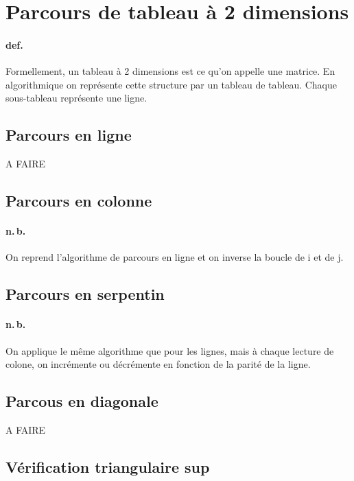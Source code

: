\documentclass{report}
\begin{document}
  \section{Parcours de tableau à 2 dimensions}

    \paragraph{def.} Formellement, un tableau à 2 dimensions est ce qu'on appelle une matrice. En algorithmique on représente cette structure par un tableau de tableau. Chaque sous-tableau représente une ligne.

    \subsection{Parcours en ligne}

    A FAIRE

    \subsection{Parcours en colonne}

    \paragraph{n.\,b.} On reprend l'algorithme de parcours en ligne et on inverse la boucle de i et de j.

    \subsection{Parcours en serpentin}

    \paragraph{n.\,b.} On applique le même algorithme que pour les lignes, mais à chaque lecture de colone, on incrémente ou décrémente en fonction de la parité de la ligne.

    \subsection{Parcous en diagonale}

    A FAIRE

    \subsection{Vérification triangulaire sup}
\end{document}
